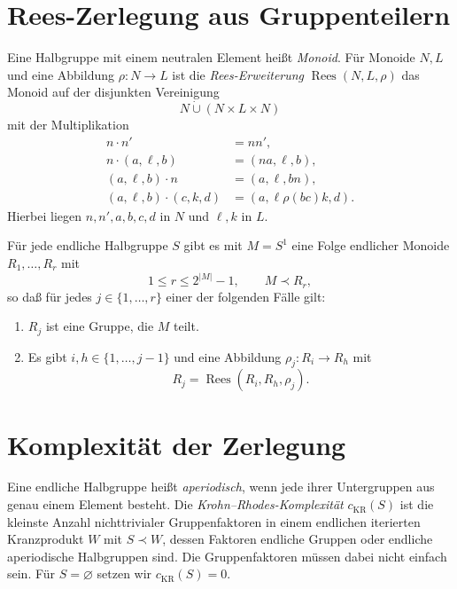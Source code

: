 \clearpage
\section{Rees-Zerlegung aus Gruppenteilern}

\begin{definition}
Eine Halbgruppe mit einem neutralen Element heißt \emph{Monoid}.
Für Monoide $N,L$ und eine Abbildung $\rho:N\to L$ ist die
\emph{Rees-Erweiterung} $\operatorname{Rees}(N,L,\rho)$ das Monoid
auf der disjunkten Vereinigung
\[
 N\mathbin{\dot\cup}(N\times L\times N)
\]
mit der Multiplikation
\[
\begin{aligned}
 n\cdot n'&=nn',\\
 n\cdot(a,\ell,b)&=(na,\ell,b),\\
 (a,\ell,b)\cdot n&=(a,\ell,bn),\\
 (a,\ell,b)\cdot(c,k,d)&=(a,\ell\rho(bc)k,d).
\end{aligned}
\]
Hierbei liegen $n,n',a,b,c,d$ in $N$ und $\ell,k$ in $L$.
\end{definition}

\begin{theorem}
\label{thm:b37-guide-rees-decomposition}
Für jede endliche Halbgruppe $S$ gibt es mit $M=S^1$ eine Folge
endlicher Monoide $R_1,\ldots,R_r$ mit
\[
 1\leq r\leq 2^{|M|}-1,\qquad M\prec R_r,
\]
so daß für jedes $j\in\{1,\ldots,r\}$ einer der folgenden Fälle gilt:
\begin{enumerate}
 \item $R_j$ ist eine Gruppe, die $M$ teilt.
 \item Es gibt $i,h\in\{1,\ldots,j-1\}$ und eine Abbildung
 $\rho_j:R_i\to R_h$ mit
 \[
 R_j=\operatorname{Rees}(R_i,R_h,\rho_j).
 \]
\end{enumerate}
\cite[Lemma~1 und Proposition~14]{DiekertWalter2016}
\end{theorem}

\clearpage
\section{Komplexität der Zerlegung}

\begin{definition}
\label{def:b37-guide-complexity}
Eine endliche Halbgruppe heißt \emph{aperiodisch}, wenn jede ihrer
Untergruppen aus genau einem Element besteht.
Die \emph{Krohn--Rhodes-Komplexität} $c_{\mathrm{KR}}(S)$ ist die kleinste
Anzahl nichttrivialer Gruppenfaktoren in einem endlichen iterierten
Kranzprodukt $W$ mit $S\prec W$, dessen Faktoren endliche Gruppen
oder endliche aperiodische Halbgruppen sind.
Die Gruppenfaktoren müssen dabei nicht einfach sein.
Für $S=\varnothing$ setzen wir $c_{\mathrm{KR}}(S)=0$.
\end{definition}

